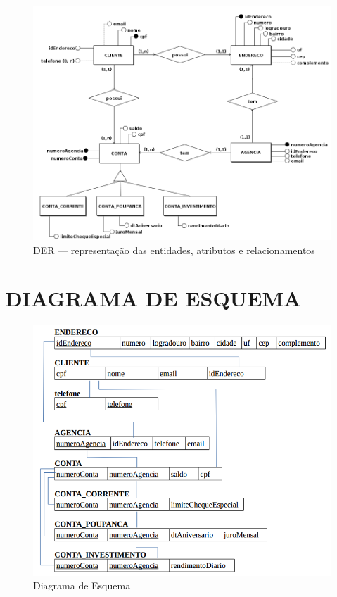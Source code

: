 \documentclass[12pt, a4paper]{article}
\begin{document}
\begin{figure}[H]
    \includegraphics[width=\linewidth]{images/DER.png}
    \caption{DER — representação das entidades, atributos e relacionamentos}
    \label{fig:diagrama}
\end{figure}

\newpage



\section{DIAGRAMA DE ESQUEMA}

\begin{figure}[H]
    \includegraphics[width=\linewidth]{images/DE.png}
    \caption{Diagrama de Esquema}
    \label{fig:diagrama2}
\end{figure}

\newpage
\end{document}
